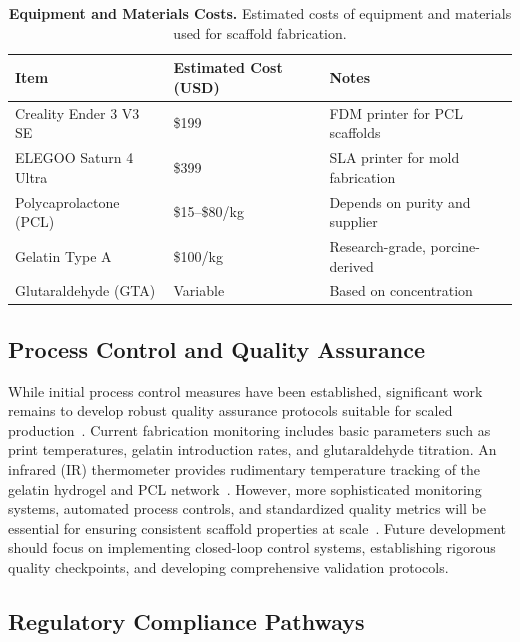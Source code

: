 \begin{table}[H]
    \centering
    \setlength{\tabcolsep}{8pt}
    \begin{tabular}{|p{5cm}|p{4cm}|p{4cm}|}
        \hline
        \rowcolor{gray!20}
        \textbf{Item} & \textbf{Estimated Cost (USD)} & \textbf{Notes} \\
        \hline
        Creality Ender 3 V3 SE & \$199 & FDM printer for PCL scaffolds \\
        \hline
        ELEGOO Saturn 4 Ultra & \$399 & SLA printer for mold fabrication \\
        \hline
        Polycaprolactone (PCL) & \$15--\$80/kg & Depends on purity and supplier \\
        \hline
        Gelatin Type A & \$100/kg & Research-grade, porcine-derived \\
        \hline
        Glutaraldehyde (GTA) & Variable & Based on concentration \\
        \hline
    \end{tabular}
    \caption[Equipment and Materials Costs]{\textbf{Equipment and Materials Costs.} Estimated costs of equipment and materials used for scaffold fabrication.}
    \label{tab:equipment_costs}
\end{table}

\subsection{Process Control and Quality Assurance}

While initial process control measures have been established, significant work remains to develop robust quality assurance protocols suitable for scaled production~\cite{chaudhuri2016hydrogelstunable}. Current fabrication monitoring includes basic parameters such as print temperatures, gelatin introduction rates, and glutaraldehyde titration. An infrared (IR) thermometer provides rudimentary temperature tracking of the gelatin hydrogel and PCL network~\cite{bigimechanicalthermal}. However, more sophisticated monitoring systems, automated process controls, and standardized quality metrics will be essential for ensuring consistent scaffold properties at scale~\cite{vedadghavami2017manufacturinghydrogel}. Future development should focus on implementing closed-loop control systems, establishing rigorous quality checkpoints, and developing comprehensive validation protocols.

\subsection{Regulatory Compliance Pathways}

